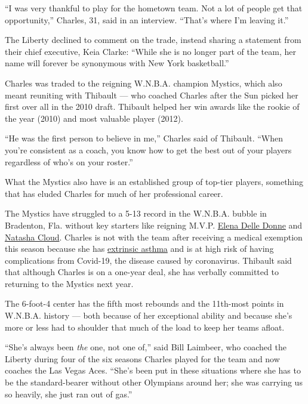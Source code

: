 ``I was very thankful to play for the hometown team. Not a lot of people
get that opportunity,'' Charles, 31, said in an interview. ``That's
where I'm leaving it.''

The Liberty declined to comment on the trade, instead sharing a
statement from their chief executive, Keia Clarke: ``While she is no
longer part of the team, her name will forever be synonymous with New
York basketball.''

Charles was traded to the reigning W.N.B.A. champion Mystics, which also
meant reuniting with Thibault --- who coached Charles after the Sun
picked her first over all in the 2010 draft. Thibault helped her win
awards like the rookie of the year (2010) and most valuable player
(2012).

``He was the first person to believe in me,'' Charles said of Thibault.
``When you're consistent as a coach, you know how to get the best out of
your players regardless of who's on your roster.''

What the Mystics also have is an established group of top-tier players,
something that has eluded Charles for much of her professional career.

The Mystics have struggled to a 5-13 record in the W.N.B.A. bubble in
Bradenton, Fla. without key starters like reigning M.V.P.
\href{https://www.nytimes3xbfgragh.onion/2020/07/14/sports/basketball/wnba-delle-donnes-opt-out.html}{Elena
Delle Donne} and
\href{https://www.nytimes3xbfgragh.onion/2020/09/02/sports/basketball/nba-wnba-activism-natasha-cloud.html}{Natasha
Cloud}. Charles is not with the team after receiving a medical exemption
this season because she has
\href{https://www.theplayerstribune.com/en-us/articles/tina-charles-wnba}{extrinsic
asthma} and is at high risk of having complications from Covid-19, the
disease caused by coronavirus. Thibault said that although Charles is on
a one-year deal, she has verbally committed to returning to the Mystics
next year.

The 6-foot-4 center has the fifth most rebounds and the 11th-most points
in W.N.B.A. history --- both because of her exceptional ability and
because she's more or less had to shoulder that much of the load to keep
her teams afloat.

``She's always been \emph{the} one, not one of,'' said Bill Laimbeer,
who coached the Liberty during four of the six seasons Charles played
for the team and now coaches the Las Vegas Aces. ``She's been put in
these situations where she has to be the standard-bearer without other
Olympians around her; she was carrying us so heavily, she just ran out
of gas.''

